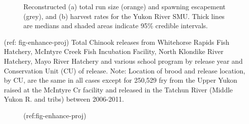 \documentclass[11pt]{book}
\begin{document}
\begin{figure}[htb]

{\centering {} 

}

\caption{Reconstructed (a) total run size (orange) and spawning escapement (grey), and (b) harvest rates for the Yukon River SMU. Thick lines are medians and shaded areas indicate 95\% credible intervals.}\label{fig:fig-smu-trends}
\end{figure}
(ref: fig-enhance-proj) Total Chinook releases from Whitehorse Rapids Fish Hatchery, McIntyre Creek Fish Incubation Facility, North Klondike River Hatchery, Mayo River Hatchery and various school program by release year and Conservation Unit (CU) of release. Note: Location of brood and release location, by CU, are the same in all cases except for 250,529 fry from the Upper Yukon raised at the McIntyre Cr facility and released in the Tatchun River (Middle Yukon R. and tribs) between 2006-2011.
\begin{figure}[htb]

{\centering {} 

}

\caption{(ref:fig-enhance-proj)}\label{fig:fig-enhance-proj}
\end{figure}
\end{document}
